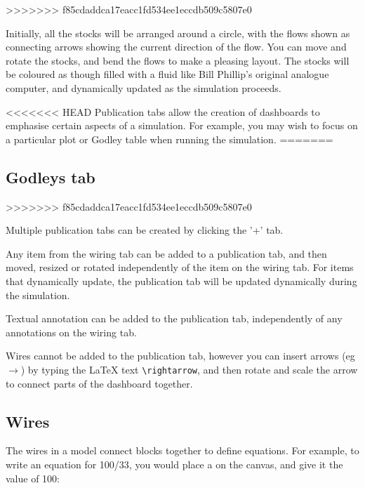 \label{tabs:Plots}
>>>>>>> f85cdaddca17eacc1fd534ee1eccdb509c5807e0

Initially, all the stocks will be arranged around a circle, with the
flows shown as connecting arrows showing the current direction of the
flow. You can move and rotate the stocks, and bend the flows to make a
pleasing layout. The stocks will be coloured as though filled with a
fluid like Bill Phillip's original analogue computer, and dynamically
updated as the simulation proceeds.

<<<<<<< HEAD
Publication tabs allow the creation of dashboards to emphasise certain
aspects of a simulation. For example, you may wish to focus on a
particular plot or Godley table when running the simulation.
=======
\subsection{Godleys tab}

\label{tabs:Godleys}
>>>>>>> f85cdaddca17eacc1fd534ee1eccdb509c5807e0

Multiple publication tabs can be created by clicking the '+' tab.

Any item from the wiring tab can be added to a publication tab, and
then moved, resized or rotated independently of the item on the wiring
tab. For items that dynamically update, the publication tab will be
updated dynamically during the simulation.

Textual annotation can be added to the publication tab, independently
of any annotations on the wiring tab.

Wires cannot be added to the publication tab, however you can insert
arrows (eg $\rightarrow$) by typing the LaTeX text \verb+\rightarrow+,
and then rotate and scale the arrow to connect parts of the dashboard together.

\subsection{Wires}

\label{Wires}

The wires in a model connect blocks together to define equations.
For example, to write an equation for 100/33, you would place a 
on the canvas, and give it the value of 100:
\begin{center}
\par\end{center}

